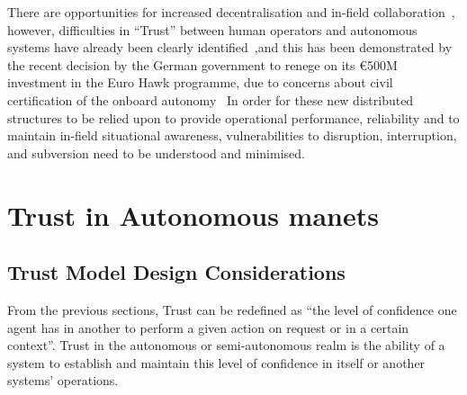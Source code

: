 There are opportunities for increased decentralisation and in-field collaboration~\cite{Walton2012}, however, difficulties in ``Trust'' between human operators and autonomous systems have already been clearly identified~\cite{Chen2011b},and this has been demonstrated by the recent decision by the German government to renege on its \euro500M investment in the Euro Hawk programme, due to concerns about civil certification of the onboard autonomy~\cite{Mehta2013}
In order for these new distributed structures to be relied upon to provide operational performance, reliability and to maintain in-field situational awareness, vulnerabilities to disruption, interruption, and subversion need to be understood and minimised.



\section{Trust in Autonomous \glspl{manet}}\label{sec:trust_manets}

\subsection{Trust Model Design Considerations}\label{sec:trust_model_design_considerations}

From the previous sections, Trust can be redefined as ``the level of confidence one agent has in another to perform a given action on request or in a certain context''.
Trust in the autonomous or semi-autonomous realm is the ability of a system to establish and maintain this level of confidence in itself or another systems' operations.

